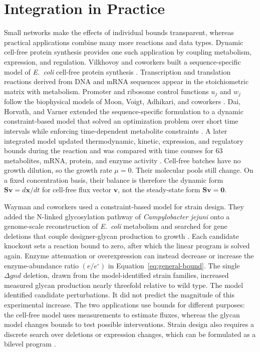 \section{Integration in Practice}\label{sec:capstones}

Small networks make the effects of individual bounds transparent, whereas
practical applications combine many more reactions and data types. Dynamic
cell-free protein synthesis provides one such application by coupling
metabolism, expression, and regulation. Vilkhovoy and coworkers built a
sequence-specific model of \emph{E.~coli}
cell-free protein synthesis \cite{Vilkhovoy2018}. Transcription and
translation reactions derived from DNA and mRNA sequences appear in the
stoichiometric matrix with metabolism. Promoter and ribosome control functions
$u_j$ and $w_j$ follow the biophysical models of Moon, Voigt, Adhikari, and
coworkers \cite{Moon2012,Adhikari2020}. Dai, Horvath, and Varner extended the
sequence-specific formulation to a dynamic constraint-based model that solved
an optimization problem over short time intervals while enforcing
time-dependent metabolite constraints \cite{Dai2018}. A later integrated model
updated thermodynamic, kinetic, expression, and regulatory bounds during the
reaction and was compared with time courses for 63 metabolites, mRNA, protein,
and enzyme activity \cite{Vilkhovoy2023}. Cell-free batches have no growth
dilution, so the growth rate $\mu=0$. Their molecular pools still change.
On a fixed concentration basis, their balance is therefore the dynamic form
$\mathbf S\mathbf v=d\mathbf x/dt$ for cell-free flux vector $\mathbf v$,
not the steady-state form $\mathbf S\mathbf v=\mathbf0$.

Wayman and coworkers used a constraint-based model for strain design. They
added the N-linked glycosylation pathway of
\emph{Campylobacter jejuni} onto a genome-scale reconstruction of
\emph{E.~coli} metabolism and searched for gene deletions that couple
designer-glycan production to growth \cite{Wayman2019}. Each candidate
knockout sets a reaction bound to zero, after which the linear program is
solved again. Enzyme attenuation or overexpression can instead decrease or
increase the enzyme-abundance ratio $(e/e^{\circ})$ in
Equation~\eqref{eq:general-bound}. The single $\Delta gnd$ deletion, drawn
from the model-identified strain families,
increased measured glycan production nearly threefold relative to wild type.
The model identified candidate perturbations. It did not predict the magnitude
of this experimental increase. The two applications use bounds for different
purposes: the cell-free model uses measurements to estimate fluxes, whereas
the glycan model changes bounds to test
possible interventions. Strain design also requires a discrete search over
deletions or expression changes, which can be formulated as a bilevel program
\cite{Burgard2003}.
